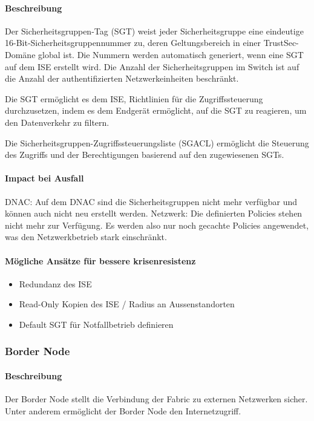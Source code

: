 \paragraph{Beschreibung}
Der Sicherheitsgruppen-Tag (SGT) weist jeder Sicherheitsgruppe eine eindeutige 16-Bit-Sicherheitsgruppennummer zu, deren Geltungsbereich in einer TrustSec-Domäne global ist. Die Nummern werden automatisch generiert, wenn eine SGT auf dem ISE erstellt wird. Die Anzahl der Sicherheitsgruppen im Switch ist auf die Anzahl der authentifizierten Netzwerkeinheiten beschränkt.

Die SGT ermöglicht es dem ISE, Richtlinien für die Zugriffssteuerung durchzusetzen, indem es dem Endgerät ermöglicht, auf die SGT zu reagieren, um den Datenverkehr zu filtern.

Die Sicherheitsgruppen-Zugriffssteuerungsliste (SGACL) ermöglicht die Steuerung des Zugriffs und der Berechtigungen basierend auf den zugewiesenen SGTs.

\paragraph{Impact bei Ausfall}
DNAC: Auf dem DNAC sind die Sicherheitsgruppen nicht mehr verfügbar und können auch nicht neu erstellt werden.
Netzwerk: Die definierten Policies stehen nicht mehr zur Verfügung. Es werden also nur noch gecachte Policies angewendet, was den Netzwerkbetrieb stark einschränkt. 

\paragraph{Mögliche Ansätze für bessere krisenresistenz}
\begin{itemize}
	\item Redundanz des ISE
	\item Read-Only Kopien des ISE / Radius an Aussenstandorten
	\item Default SGT für Notfallbetrieb definieren
\end{itemize}

\subsubsection{Border Node}

\paragraph{Beschreibung}

Der Border Node stellt die Verbindung der Fabric zu externen Netzwerken sicher. Unter anderem ermöglicht der Border Node den Internetzugriff.

